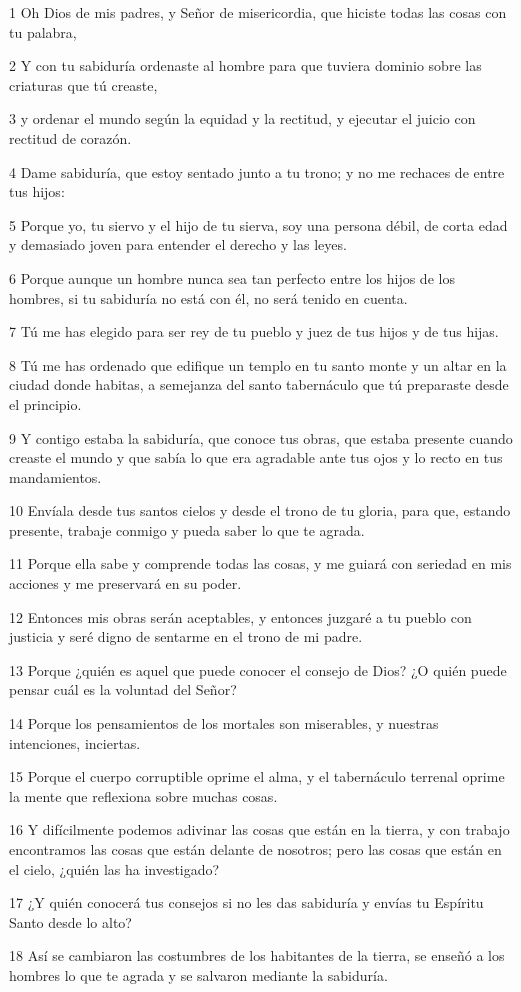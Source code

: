 \par 1 Oh Dios de mis padres, y Señor de misericordia, que hiciste todas las cosas con tu palabra,
\par 2 Y con tu sabiduría ordenaste al hombre para que tuviera dominio sobre las criaturas que tú creaste,
\par 3 y ordenar el mundo según la equidad y la rectitud, y ejecutar el juicio con rectitud de corazón.
\par 4 Dame sabiduría, que estoy sentado junto a tu trono; y no me rechaces de entre tus hijos:
\par 5 Porque yo, tu siervo y el hijo de tu sierva, soy una persona débil, de corta edad y demasiado joven para entender el derecho y las leyes.
\par 6 Porque aunque un hombre nunca sea tan perfecto entre los hijos de los hombres, si tu sabiduría no está con él, no será tenido en cuenta.
\par 7 Tú me has elegido para ser rey de tu pueblo y juez de tus hijos y de tus hijas.
\par 8 Tú me has ordenado que edifique un templo en tu santo monte y un altar en la ciudad donde habitas, a semejanza del santo tabernáculo que tú preparaste desde el principio.
\par 9 Y contigo estaba la sabiduría, que conoce tus obras, que estaba presente cuando creaste el mundo y que sabía lo que era agradable ante tus ojos y lo recto en tus mandamientos.
\par 10 Envíala desde tus santos cielos y desde el trono de tu gloria, para que, estando presente, trabaje conmigo y pueda saber lo que te agrada.
\par 11 Porque ella sabe y comprende todas las cosas, y me guiará con seriedad en mis acciones y me preservará en su poder.
\par 12 Entonces mis obras serán aceptables, y entonces juzgaré a tu pueblo con justicia y seré digno de sentarme en el trono de mi padre.
\par 13 Porque ¿quién es aquel que puede conocer el consejo de Dios? ¿O quién puede pensar cuál es la voluntad del Señor?
\par 14 Porque los pensamientos de los mortales son miserables, y nuestras intenciones, inciertas.
\par 15 Porque el cuerpo corruptible oprime el alma, y ​​el tabernáculo terrenal oprime la mente que reflexiona sobre muchas cosas.
\par 16 Y difícilmente podemos adivinar las cosas que están en la tierra, y con trabajo encontramos las cosas que están delante de nosotros; pero las cosas que están en el cielo, ¿quién las ha investigado?
\par 17 ¿Y quién conocerá tus consejos si no les das sabiduría y envías tu Espíritu Santo desde lo alto?
\par 18 Así se cambiaron las costumbres de los habitantes de la tierra, se enseñó a los hombres lo que te agrada y se salvaron mediante la sabiduría.

